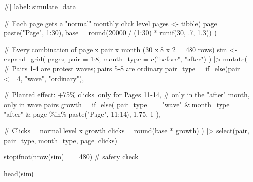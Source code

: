 \documentclass[
  9pt,
  letterpaper,
  DIV=11,
  numbers=noendperiod]{scrartcl}
\newenvironment{Shaded}{\begin{snugshade}}{\end{snugshade}}
\newcommand{\AttributeTok}[1]{\textcolor[rgb]{0.40,0.45,0.13}{#1}}
\newcommand{\CommentTok}[1]{\textcolor[rgb]{0.37,0.37,0.37}{#1}}
\newcommand{\DecValTok}[1]{\textcolor[rgb]{0.68,0.00,0.00}{#1}}
\newcommand{\FloatTok}[1]{\textcolor[rgb]{0.68,0.00,0.00}{#1}}
\newcommand{\FunctionTok}[1]{\textcolor[rgb]{0.28,0.35,0.67}{#1}}
\newcommand{\NormalTok}[1]{\textcolor[rgb]{0.00,0.23,0.31}{#1}}
\newcommand{\OtherTok}[1]{\textcolor[rgb]{0.00,0.23,0.31}{#1}}
\newcommand{\SpecialCharTok}[1]{\textcolor[rgb]{0.37,0.37,0.37}{#1}}
\newcommand{\StringTok}[1]{\textcolor[rgb]{0.13,0.47,0.30}{#1}}
\begin{document}
\begin{Shaded}
\begin{Highlighting}[]
\CommentTok{\#| label: simulate\_data}

\CommentTok{\# Each page gets a "normal" monthly click level}
\NormalTok{pages }\OtherTok{\textless{}{-}} 
  \FunctionTok{tibble}\NormalTok{(}
    \AttributeTok{page =} \FunctionTok{paste}\NormalTok{(}\StringTok{"Page"}\NormalTok{, }\DecValTok{1}\SpecialCharTok{:}\DecValTok{30}\NormalTok{),}
    \AttributeTok{base =} \FunctionTok{round}\NormalTok{(}\DecValTok{20000} \SpecialCharTok{/}\NormalTok{ (}\DecValTok{1}\SpecialCharTok{:}\DecValTok{30}\NormalTok{) }\SpecialCharTok{*} \FunctionTok{runif}\NormalTok{(}\DecValTok{30}\NormalTok{, .}\DecValTok{7}\NormalTok{, }\FloatTok{1.3}\NormalTok{))}
\NormalTok{  )}

\CommentTok{\# Every combination of page x pair x month (30 x 8 x 2 = 480 rows)}
\NormalTok{sim }\OtherTok{\textless{}{-}} \FunctionTok{expand\_grid}\NormalTok{(}
\NormalTok{  pages,}
  \AttributeTok{pair =} \DecValTok{1}\SpecialCharTok{:}\DecValTok{8}\NormalTok{,}
  \AttributeTok{month\_type =} \FunctionTok{c}\NormalTok{(}\StringTok{"before"}\NormalTok{, }\StringTok{"after"}\NormalTok{)}
\NormalTok{) }\SpecialCharTok{|\textgreater{}}
  \FunctionTok{mutate}\NormalTok{(}
    \CommentTok{\# Pairs 1{-}4 are protest waves; pairs 5{-}8 are ordinary}
    \AttributeTok{pair\_type =} \FunctionTok{if\_else}\NormalTok{(pair }\SpecialCharTok{\textless{}=} \DecValTok{4}\NormalTok{, }\StringTok{"wave"}\NormalTok{, }\StringTok{"ordinary"}\NormalTok{),}
    
    \CommentTok{\# Planted effect: +75\% clicks, only for Pages 11{-}14,}
    \CommentTok{\# only in the "after" month, only in wave pairs}
    \AttributeTok{growth =} \FunctionTok{if\_else}\NormalTok{(}
\NormalTok{      pair\_type }\SpecialCharTok{==} \StringTok{"wave"} \SpecialCharTok{\&}\NormalTok{ month\_type }\SpecialCharTok{==} \StringTok{"after"} \SpecialCharTok{\&}
\NormalTok{        page }\SpecialCharTok{\%in\%} \FunctionTok{paste}\NormalTok{(}\StringTok{"Page"}\NormalTok{, }\DecValTok{11}\SpecialCharTok{:}\DecValTok{14}\NormalTok{),}
      \FloatTok{1.75}\NormalTok{, }\DecValTok{1}
\NormalTok{    ),}
    
    \CommentTok{\# Clicks = normal level x growth}
    \AttributeTok{clicks =} \FunctionTok{round}\NormalTok{(base }\SpecialCharTok{*}\NormalTok{ growth)}
\NormalTok{  ) }\SpecialCharTok{|\textgreater{}}
  \FunctionTok{select}\NormalTok{(pair, pair\_type, month\_type, page, clicks)}

\FunctionTok{stopifnot}\NormalTok{(}\FunctionTok{nrow}\NormalTok{(sim) }\SpecialCharTok{==} \DecValTok{480}\NormalTok{)  }\CommentTok{\# safety check}

\FunctionTok{head}\NormalTok{(sim)}
\end{Highlighting}
\end{Shaded}
\end{document}
